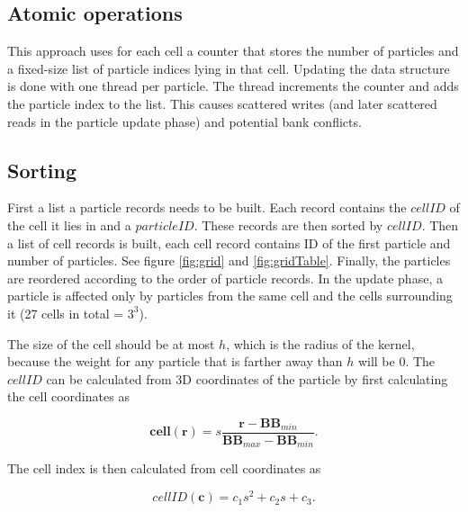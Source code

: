\documentclass[a4paper,report]{IEEEtran}
\begin{document}
\subsection{Atomic operations}
This approach uses for each cell a counter that stores the number of particles and a fixed-size list of particle indices lying in that cell. Updating the data structure is done with one thread per particle. The thread increments the counter and adds the particle index to the list. This causes scattered writes (and later scattered reads in the particle update phase) and potential bank conflicts.

\subsection{Sorting}
First a list a particle records needs to be built. Each record contains the $cellID$ of the cell it lies in and a $particleID$. These records are then sorted by $cellID$. Then a list of cell records is built, each cell record contains ID of the first particle and number of particles. See figure \ref{fig:grid} and \ref{fig:gridTable}. Finally, the particles are reordered according to the order of particle records. In the update phase, a particle is affected only by particles from the same cell and the cells surrounding it (27 cells in total = $3^3$). 

The size of the cell should be at most $h$, which is the radius of the kernel, because the weight for any particle that is farther away than $h$ will be 0. The $cellID$ can be calculated from 3D coordinates of the particle by first calculating the cell coordinates as 

\begin{equation}
	\mathbf{cell}(\mathbf{r}) = s\frac{\mathbf{r}-\mathbf{BB}_{min}}{\mathbf{BB}_{max} - \mathbf{BB}_{min}}.
\end{equation}

The cell index is then calculated from cell coordinates as

\begin{equation}
	cellID(\mathbf{c}) = c_1s^2 + c_2s + c_3.
\end{equation}
\end{document}
